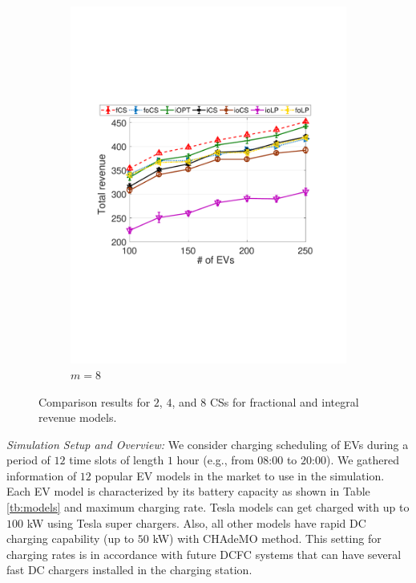 \documentclass[journal]{IEEEtran}
\newcommand{\revv}[1]{{\color{black}#1}}%
\begin{document}
\begin{figure}[t]
\begin{subfigure}[b]{0.25\textwidth}
\begin{center}
						\includegraphics[width=\textwidth]{V-N-M8.pdf}
						\caption{\revv{$m=8$}}
						\label{fig:V-N-M8}
					\end{center}
				\end{subfigure}%
				\caption{\revv{Comparison results for $2$, $4$, and $8$ CSs for fractional and integral revenue models.}} 
				\label{fig:V-N-M}
			\end{figure}
\textit{Simulation Setup and Overview:} We consider charging scheduling of EVs \revv{during a period of $12$ time slots of length $1$ hour (e.g., from $08$:$00$ to $20$:$00$)}. 
We gathered information of \revv{$12$} popular EV models in the market to use in the simulation. Each EV model is characterized by its battery capacity as shown in Table \ref{tb:models} and maximum charging rate. \revv{Tesla models can get charged with up to $100$ kW using Tesla super chargers. Also, all other models have rapid DC charging capability (up to $50$ kW) with CHAdeMO method. This setting for charging rates is in accordance with future DCFC systems that can have several fast DC chargers installed in the charging station.} 
\end{document}
